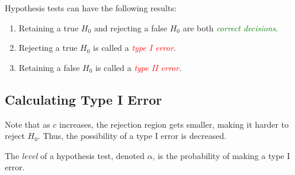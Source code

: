 \documentclass[letterpaper,12pt,fleqn]{article}
\renewcommand{\a}{\alpha}
\begin{document}
\begin{definition}
  Hypothesis tests can have the following results:
  \begin{enumerate}
  \item Retaining a true \(H_0\) and rejecting a false \(H_0\) are both \emph{\textcolor{green}{correct decisions}}.
  \item Rejecting a true \(H_0\) is called a \emph{\textcolor{red}{type I error}}.
  \item Retaining a false \(H_0\) is called a \emph{\textcolor{red}{type II error}}.
  \end{enumerate}
\end{definition}

\subsection*{Calculating Type I Error}

Note that as \(c\) increases, the rejection region gets smaller, making it harder to reject \(H_0\).  Thus, the possibility
of a type I error is decreased.

\begin{definition}[Level]
  The \emph{level} of a hypothesis test, denoted \(\a\), is the probability of making a type I error.
\end{definition}
\end{document}
